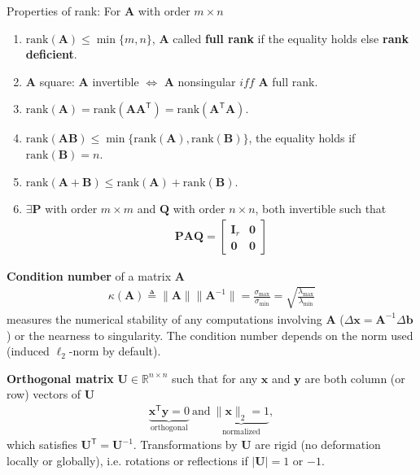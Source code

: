 Properties of rank: For $\mathbf{A}$ with order $m\times n$
\begin{enumerate}[{(1)}]
    \item $\mathrm{rank}(\mathbf{A})\leq\min\{m,n\}$, 
    $\mathbf{A}$ called \textbf{full rank} if the equality holds else \textbf{rank deficient}.
    \item $\mathbf{A}$ square: $\mathbf{A}$ invertible $\iff$ $\mathbf{A}$ nonsingular $iff$ $\mathbf{A}$ full rank.
    \item $\mathrm{rank}(\mathbf{A})=\mathrm{rank}(\mathbf{AA}^\mathsf{T})=\mathrm{rank}(\mathbf{A}^\mathsf{T}\mathbf{A})$.
    \item $\mathrm{rank}(\mathbf{AB})\leq\min\{\mathrm{rank}(\mathbf{A}),\mathrm{rank}(\mathbf{B})\}$, the equality holds if $\mathrm{rank}(\mathbf{B})=n$.
    \item $\mathrm{rank}(\mathbf{A}+\mathbf{B})\leq\mathrm{rank}(\mathbf{A})+\mathrm{rank}(\mathbf{B})$.
    \item $\exists \mathbf{P}$ with order $m\times{m}$ and $\mathbf{Q}$ with order $n\times n$, both invertible such that 
    \begin{gather}
        \mathbf{PAQ}=\left[\begin{array}{cc}
            \mathbf{I}_r & \mathbf{0} \\
            \mathbf{0} & \mathbf{0}
        \end{array}\right]
    \end{gather}
\end{enumerate}

\textbf{Condition number} of a matrix $\mathbf{A}$
\begin{gather}
    \kappa(\mathbf{A})
    \triangleq \|\mathbf{A}\|\|\mathbf{A}^{-1}\|
    = \frac{\sigma_{\text{max}}}{\sigma_{\text{min}}}
    = \sqrt{\frac{\lambda_{\text{max}}}{\lambda_{\text{min}}}}
\end{gather}
measures the numerical stability of any computations involving $\mathbf{A}$ ($\Delta\bm{x}=\mathbf{A}^{-1}\Delta\bm{b}$) 
or the nearness to singularity.
The condition number depends on the norm used (induced $\ell_2$-norm by default).

\textbf{Orthogonal matrix} $\mathbf{U}\in\mathbb{R}^{n\times n}$ such that 
for any $\bm{x}$ and $\bm{y}$ are both column (or row) vectors of $\mathbf{U}$
\begin{gather}
    \underbrace{\bm{x}^\mathsf{T}\bm{y}=0}_{\text{orthogonal}}
    ~\text{and}~
    \underbrace{\|\bm{x}\|_2=1}_{\text{normalized}},
\end{gather}
which satisfies $\mathbf{U}^\mathsf{T}=\mathbf{U}^{-1}$.
Transformations by $\mathbf{U}$ are rigid (no deformation locally or globally), 
i.e. rotations or reflections if $|\mathbf{U}|=1$ or $-1$.

